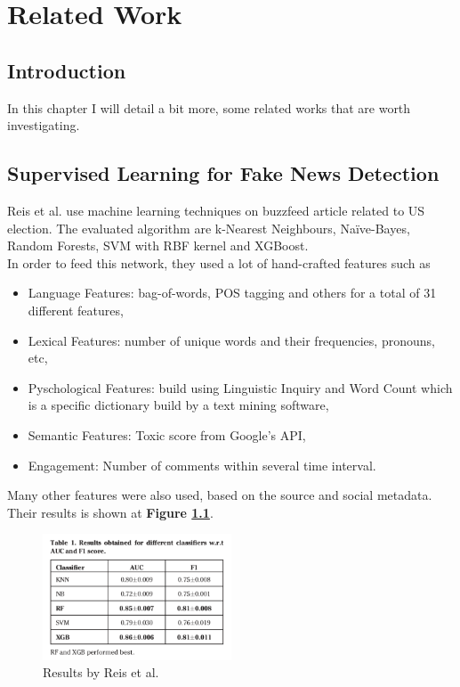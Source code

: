 \chapter{Related Work}
\section{Introduction}
In this chapter I will detail a bit more, some related works that are worth investigating. 
\section{Supervised Learning for Fake News Detection\cite{Reis2019}}
Reis et al. use machine learning techniques on buzzfeed article related to US election. The evaluated algorithm are k-Nearest Neighbours, Na\"ive-Bayes, Random Forests, SVM with RBF kernel and XGBoost. \\

In order to feed this network, they used a lot of hand-crafted features such as 
\begin{itemize}
 \item Language Features: bag-of-words, POS tagging and others for a total of 31 different features,
 \item Lexical Features: number of unique words and their frequencies, pronouns, etc,
 \item Pyschological Features\cite{Pennebaker2001}: build using Linguistic Inquiry and Word Count which is a specific dictionary build by a text mining software,
 \item Semantic Features: Toxic score from Google's API,
 \item Engagement: Number of comments within several time interval.
\end{itemize}

Many other features were also used, based on the source and social metadata. \\

Their results is shown at \textbf{Figure \ref{fig:chap1:reis}}.

\begin{figure}[h]
 \centering
 \includegraphics[width=0.5\textwidth]{images/chap1_bis/rev1.png}
 \caption{Results by Reis et al. }
 \label{fig:chap1:reis}
\end{figure}

